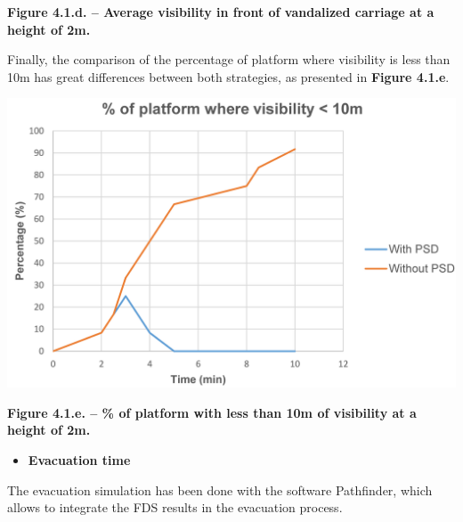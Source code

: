 \documentclass{article}
\begin{document}
\begin{mdcenter}%

\noindent{}\textbf{Figure 4.1.d. – Average visibility in front of vandalized carriage at a height of 2m.}%
\end{mdcenter}%

\noindent{}Finally, the comparison of the percentage of platform where visibility is less 
than 10m has great differences between both strategies, as presented in \textbf{Figure 4.1.e}.%

\begin{mdcenter}%

\noindent{}\includegraphics[keepaspectratio=true,width=\dimmin{}{\dimwidth{0.55}}]{images/Fig-4.1.e}{}%
\end{mdcenter}%

\begin{mdcenter}%

\noindent{}\textbf{Figure 4.1.e. – \% of platform with less than 10m of visibility at a height of 2m.}%
\end{mdcenter}%

\begin{itemize}[noitemsep,topsep=\mdcompacttopsep]%

\item{}\textbf{Evacuation time}%
\end{itemize}%

\noindent{}The evacuation simulation has been done with the software Pathfinder, which 
allows to integrate the FDS results in the evacuation process.%
\end{document}
